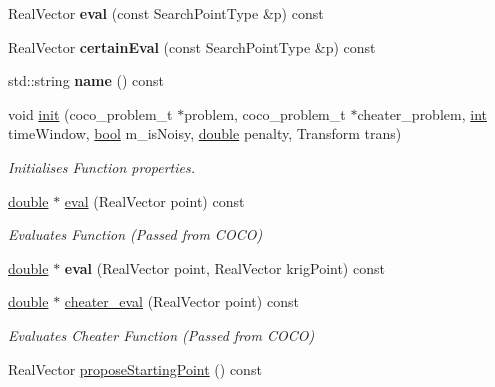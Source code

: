 \begin{DoxyCompactItemize}
\item 
Real\+Vector {\bfseries eval} (const Search\+Point\+Type \&p) const \hypertarget{classUncertainFunc__m_a22f62e370734c24208ecc3ff8a417d4d}{}\label{classUncertainFunc__m_a22f62e370734c24208ecc3ff8a417d4d}

\item 
Real\+Vector {\bfseries certain\+Eval} (const Search\+Point\+Type \&p) const \hypertarget{classUncertainFunc__m_ae868152602bfc04a23094fffe764eeaa}{}\label{classUncertainFunc__m_ae868152602bfc04a23094fffe764eeaa}

\item 
std\+::string {\bfseries name} () const \hypertarget{classUncertainFunc__m_ab3e0ec0235f45adbfb4438d1a5599dc9}{}\label{classUncertainFunc__m_ab3e0ec0235f45adbfb4438d1a5599dc9}

\item 
void \hyperlink{classCOCOfunc_aef35b3b037b11a843bb77fd269f5447f}{init} (coco\+\_\+problem\+\_\+t $\ast$problem, coco\+\_\+problem\+\_\+t $\ast$cheater\+\_\+problem, \hyperlink{classint}{int} time\+Window, \hyperlink{classbool}{bool} m\+\_\+is\+Noisy, \hyperlink{classdouble}{double} penalty, Transform trans)
\begin{DoxyCompactList}\small\item\em Initialises Function properties. \end{DoxyCompactList}\item 
\hyperlink{classdouble}{double} $\ast$ \hyperlink{classCOCOfunc_af59cef4f0a78c07c4910bf015363c3f5}{eval} (Real\+Vector point) const
\begin{DoxyCompactList}\small\item\em Evaluates Function (Passed from C\+O\+CO) \end{DoxyCompactList}\item 
\hyperlink{classdouble}{double} $\ast$ {\bfseries eval} (Real\+Vector point, Real\+Vector krig\+Point) const\hypertarget{classCOCOfunc_a5212e78af436dfe41259bf21217cb80b}{}\label{classCOCOfunc_a5212e78af436dfe41259bf21217cb80b}

\item 
\hyperlink{classdouble}{double} $\ast$ \hyperlink{classCOCOfunc_aaf37b734aed084757a8ccf5ad4d66705}{cheater\+\_\+eval} (Real\+Vector point) const
\begin{DoxyCompactList}\small\item\em Evaluates Cheater Function (Passed from C\+O\+CO) \end{DoxyCompactList}\item 
Real\+Vector \hyperlink{classCOCOfunc_a2a5d8bccb6235159b8f28be24c989d07}{propose\+Starting\+Point} () const\hypertarget{classCOCOfunc_a2a5d8bccb6235159b8f28be24c989d07}{}\label{classCOCOfunc_a2a5d8bccb6235159b8f28be24c989d07}


\end{DoxyCompactItemize}
